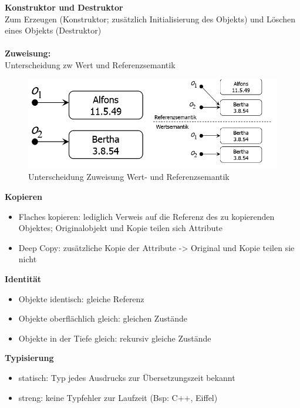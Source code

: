 \textbf{Konstruktor und Destruktor}\\
Zum Erzeugen (Konstruktor; zusätzlich Initialisierung des Objekts) und Löschen eines Objekts (Destruktor)\\
\\
\textbf{Zuweisung:}\\
Unterscheidung zw Wert und Referenzsemantik
\begin{figure}[!h]
	\centering
	\includegraphics[scale=0.5]{img/value_ref_semantics.png}
	\caption{Unterscheidung Zuweisung Wert- und Referenzsemantik}
\end{figure}

\textbf{Kopieren}
\begin{itemize}
	\item Flaches kopieren: lediglich Verweis auf die Referenz des zu kopierenden Objektes; Originalobjekt und Kopie teilen sich Attribute
	\item Deep Copy: zusätzliche Kopie der Attribute -> Original und Kopie teilen sie nicht
\end{itemize}

\textbf{Identität}
\begin{itemize}
	\item Objekte identisch: gleiche Referenz
	\item Objekte oberflächlich gleich: gleichen Zustände
	\item Objekte in der Tiefe gleich: rekursiv gleiche Zustände
\end{itemize}

\textbf{Typisierung}
\begin{itemize}
	\item statisch: Typ jedes Ausdrucks zur Übersetzungszeit bekannt
	\item streng: keine Typfehler zur Laufzeit (Bsp: C++, Eiffel)
\end{itemize}

